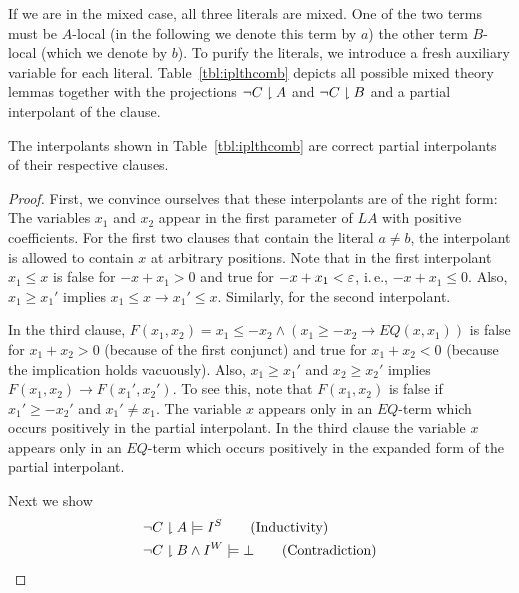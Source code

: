 \begin{techreport}
If we are in the mixed case, all three literals are mixed. One of the two
terms must be $A$-local (in the following we denote this term by $a$) the
other term $B$-local (which we denote by $b$). To purify the literals, we introduce a fresh auxiliary
variable for each literal. Table~\ref{tbl:iplthcomb} depicts all possible mixed
theory lemmas together with the projections $\lnot C \downharpoonright A$ and $\lnot C
\downharpoonright B$ and a partial interpolant of the clause.

\begin{lemma}
The interpolants shown in Table~\ref{tbl:iplthcomb} are correct
partial interpolants of their respective clauses.
\end{lemma}

\begin{proof}
  First, we convince ourselves that these interpolants are of the right form:  The
  variables $x_1$ and $x_2$ appear in the first parameter of $LA$ with positive
  coefficients.  For the first two clauses that contain the literal $a\neq b$,
  the interpolant is allowed to contain $x$ at arbitrary positions.  
  \ifnewinterpolation Note that in the first interpolant
  $x_1\leq x$ is false for $-x+x_1 > 0$ and true for $-x+x_1 <\varepsilon$, 
  i.\,e., $-x+x_1 \leq 0$.  Also, $x_1 \geq x_1'$ implies 
  $x_1\leq x \rightarrow x_1' \leq x$.  Similarly, for the second interpolant.

  In the
  third clause,
  $F(x_1,x_2) = x_1\leq -x_2 \land (x_1\geq -x_2 \rightarrow EQ(x, x_1))$ 
  is false for $x_1 + x_2 > 0$ (because of the first conjunct) and true 
  for $x_1 + x_2 < 0$ (because the implication holds vacuously).
  Also, $x_1 \geq x_1'$ and $x_2 \geq x_2'$ implies 
  $F(x_1,x_2) \rightarrow F(x_1', x_2')$.  To see this, note that
  $F(x_1,x_2)$ is false if $x_1' \geq -x_2'$ and $x_1' \neq x_1$.
  The variable $x$ appears only in an $EQ$-term which occurs
  positively in the partial interpolant. 
  \else  
  In the
  third clause the variable $x$ appears only in an $EQ$-term which occurs
  positively in the expanded form of the partial interpolant. 
  \fi

  Next we show
  \begin{align*}
    &\lnot C \downharpoonright A \models I^S \tag{Inductivity}\\
    &\lnot C \downharpoonright B \land I^W \models \bot \tag{Contradiction}
  \end{align*}


\end{proof}
\end{techreport}
